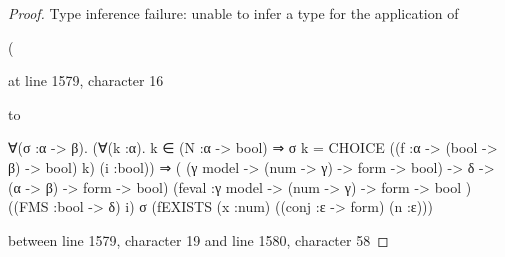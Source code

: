 \documentclass[letterpaper]{article}
\renewcommand{\HOLConst}[1]{{\textsf{\upshape\small #1}}}
\renewcommand{\HOLinline}[1]{\ensuremath{#1}}
\begin{document}
\begin{proof}








%
Type inference failure: unable to infer a type for the application of

(%

at line 1579, character 16

to

∀(σ :α -> β).
    (∀(k :α).
         k ∈ (N :α -> bool) ⇒
         σ k = CHOICE ((f :α -> (bool -> β) -> bool) k) (i :bool)) ⇒
    (%
       (γ model -> (num -> γ) -> form -> bool) ->
       δ -> (α -> β) -> form -> bool)
      (feval :γ model -> (num -> γ) -> form -> bool ) ((FMS :bool -> δ) i) σ
      (fEXISTS (x :num) ((conj :ε -> form) (n :ε)))

between line 1579, character 19 and line 1580, character 58


\end{proof}
\end{document}
